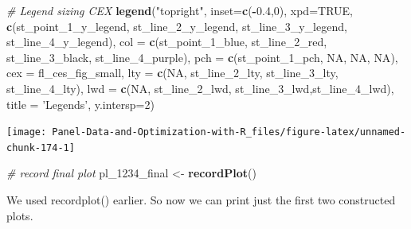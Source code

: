\documentclass[
]{book}
\newenvironment{Shaded}{\begin{snugshade}}{\end{snugshade}}
\newcommand{\CommentTok}[1]{\textcolor[rgb]{0.56,0.35,0.01}{\textit{#1}}}
\newcommand{\DataTypeTok}[1]{\textcolor[rgb]{0.13,0.29,0.53}{#1}}
\newcommand{\DecValTok}[1]{\textcolor[rgb]{0.00,0.00,0.81}{#1}}
\newcommand{\FloatTok}[1]{\textcolor[rgb]{0.00,0.00,0.81}{#1}}
\newcommand{\KeywordTok}[1]{\textcolor[rgb]{0.13,0.29,0.53}{\textbf{#1}}}
\newcommand{\NormalTok}[1]{#1}
\newcommand{\OperatorTok}[1]{\textcolor[rgb]{0.81,0.36,0.00}{\textbf{#1}}}
\newcommand{\OtherTok}[1]{\textcolor[rgb]{0.56,0.35,0.01}{#1}}
\newcommand{\StringTok}[1]{\textcolor[rgb]{0.31,0.60,0.02}{#1}}
\begin{document}
\begin{Shaded}
\begin{Highlighting}[]
\CommentTok{# Legend sizing CEX}
\KeywordTok{legend}\NormalTok{(}\StringTok{"topright"}\NormalTok{,}
       \DataTypeTok{inset=}\KeywordTok{c}\NormalTok{(}\OperatorTok{-}\FloatTok{0.4}\NormalTok{,}\DecValTok{0}\NormalTok{),}
       \DataTypeTok{xpd=}\OtherTok{TRUE}\NormalTok{,}
       \KeywordTok{c}\NormalTok{(st_point_}\DecValTok{1}\NormalTok{_y_legend, st_line_}\DecValTok{2}\NormalTok{_y_legend, st_line_}\DecValTok{3}\NormalTok{_y_legend, st_line_}\DecValTok{4}\NormalTok{_y_legend),}
       \DataTypeTok{col =} \KeywordTok{c}\NormalTok{(st_point_}\DecValTok{1}\NormalTok{_blue, st_line_}\DecValTok{2}\NormalTok{_red, st_line_}\DecValTok{3}\NormalTok{_black, st_line_}\DecValTok{4}\NormalTok{_purple),}
       \DataTypeTok{pch =} \KeywordTok{c}\NormalTok{(st_point_}\DecValTok{1}\NormalTok{_pch, }\OtherTok{NA}\NormalTok{, }\OtherTok{NA}\NormalTok{, }\OtherTok{NA}\NormalTok{),}
       \DataTypeTok{cex =}\NormalTok{ fl_ces_fig_small,}
       \DataTypeTok{lty =} \KeywordTok{c}\NormalTok{(}\OtherTok{NA}\NormalTok{, st_line_}\DecValTok{2}\NormalTok{_lty, st_line_}\DecValTok{3}\NormalTok{_lty, st_line_}\DecValTok{4}\NormalTok{_lty),}
       \DataTypeTok{lwd =} \KeywordTok{c}\NormalTok{(}\OtherTok{NA}\NormalTok{, st_line_}\DecValTok{2}\NormalTok{_lwd, st_line_}\DecValTok{3}\NormalTok{_lwd,st_line_}\DecValTok{4}\NormalTok{_lwd),}
       \DataTypeTok{title =} \StringTok{'Legends'}\NormalTok{,}
       \DataTypeTok{y.intersp=}\DecValTok{2}\NormalTok{)}
\end{Highlighting}
\end{Shaded}

\begin{center}\texttt{[image: Panel-Data-and-Optimization-with-R\_files/figure-latex/unnamed-chunk-174-1]} \end{center}

\begin{Shaded}
\begin{Highlighting}[]
\CommentTok{# record final plot}
\NormalTok{pl_}\DecValTok{1234}\NormalTok{_final <-}\StringTok{ }\KeywordTok{recordPlot}\NormalTok{()}
\end{Highlighting}
\end{Shaded}

We used recordplot() earlier. So now we can print just the first two constructed plots.
\end{document}
